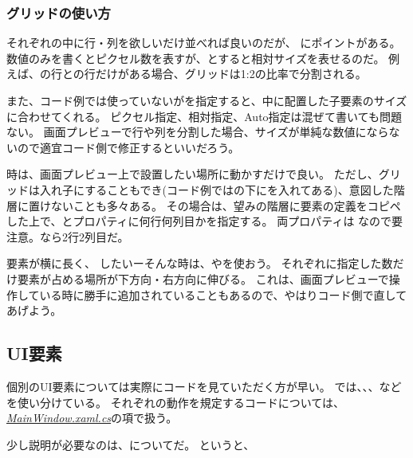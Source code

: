 \documentclass[letterpaper,10pt,dvipdfmx]{sphinxmanual}
\begin{document}
\subsubsection{グリッドの使い方}
\label{\detokenize{nissyu-idohen/pc-software-code:id8}}
それぞれの中に行・列を欲しいだけ並べれば良いのだが、
にポイントがある。
数値のみを書くとピクセル数を表すが、とすると相対サイズを表せるのだ。
例えば、の行との行だけがある場合、グリッドは1:2の比率で分割される。

また、コード例では使っていないがを指定すると、中に配置した子要素のサイズに合わせてくれる。
ピクセル指定、相対指定、Auto指定は混ぜて書いても問題ない。
画面プレビューで行や列を分割した場合、サイズが単純な数値にならないので適宜コード側で修正するといいだろう。

時は、画面プレビュー上で設置したい場所に動かすだけで良い。
ただし、グリッドは入れ子にすることもでき(コード例ではの下にを入れてある)、意図した階層に置けないことも多々ある。
その場合は、望みの階層に要素の定義をコピペした上で、とプロパティに何行何列目かを指定する。
両プロパティは
なので要注意。なら2行2列目だ。

要素が横に長く、
したいーそんな時は、やを使おう。
それぞれに指定した数だけ要素が占める場所が下方向・右方向に伸びる。
これは、画面プレビューで操作している時に勝手に追加されていることもあるので、やはりコード側で直してあげよう。


\subsection{UI要素}
\label{\detokenize{nissyu-idohen/pc-software-code:ui}}
個別のUI要素については実際にコードを見ていただく方が早い。
では、、、などを使い分けている。
それぞれの動作を規定するコードについては、{\hyperref[\detokenize{nissyu-idohen/pc-software-code:mainwindow-xaml-cs}]{\emph{MainWindow.xaml.cs}}}の項で扱う。

少し説明が必要なのは、についてだ。 
というと、
\end{document}
